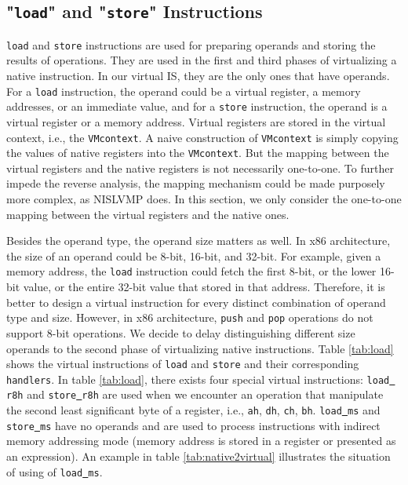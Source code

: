 \subsection{"\texttt{load}" and "\texttt{store}" Instructions}
\texttt{load} and \texttt{store} instructions are used for preparing operands and storing the results of operations. They are used in the first and third phases of virtualizing a native instruction. In our virtual IS, they are the only ones that have operands. For a \texttt{load} instruction, the operand could be a virtual register, a memory addresses, or an immediate value, and for a \texttt{store} instruction, the operand is a virtual register or a memory address. Virtual registers are stored in the virtual context, i.e., the \texttt{VMcontext}. A naive construction of \texttt{VMcontext} is simply copying the values of native registers into the \texttt{VMcontext}. But the mapping between the virtual registers and the native registers is not necessarily one-to-one. To further impede the reverse analysis, the mapping mechanism could be made purposely more complex, as NISLVMP \cite{wang2013nislvmp} does. In this section, we only consider the one-to-one mapping between the virtual registers and the native ones.



Besides the operand type, the operand size matters as well. In x86 architecture, the size of an operand could be 8-bit, 16-bit, and 32-bit. For example, given a memory address, the \texttt{load} instruction could fetch the first 8-bit, or the lower 16-bit value, or the entire 32-bit value that stored in that address. Therefore, it is better to design a virtual instruction for every distinct combination of operand type and size. However, in x86 architecture, \texttt{push} and \texttt{pop} operations do not support 8-bit operations. We decide to delay distinguishing different size operands to the second phase of virtualizing native instructions. Table \ref{tab:load} shows the virtual instructions of \texttt{load} and \texttt{store} and their corresponding \texttt{handlers}. In table \ref{tab:load}, there exists four special virtual instructions: \texttt{load\underline{ }r8h} and \texttt{store\underline{ }r8h} are used when we encounter an operation that manipulate the second least significant byte of a register, i.e., \texttt{ah}, \texttt{dh}, \texttt{ch}, \texttt{bh}. \texttt{load\underline{ }ms} and \texttt{store\underline{ }ms} have no operands and are used to process instructions with indirect memory addressing mode (memory address is stored in a register or presented as an expression). An example in table \ref{tab:native2virtual} illustrates the situation of using of \texttt{load\underline{ }ms}.

